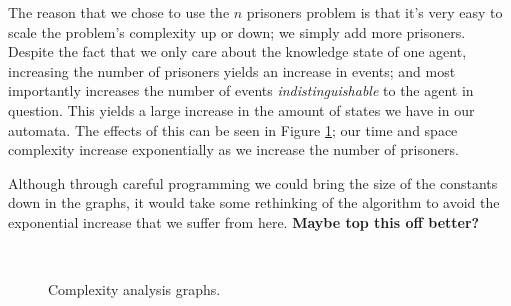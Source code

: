 \documentclass[10pt, a4paper]{report}
\begin{document}
The reason that we chose to use the $n$ prisoners problem is that it's very easy
to scale the problem's complexity up or down; we simply add more prisoners.
Despite the fact that we only care about the knowledge state of one agent,
increasing the number of prisoners yields an increase in events; and most
importantly increases the number of events \emph{indistinguishable} to the agent
in question. This yields a large increase in the amount of states we have in our
automata. The effects of this can be seen in Figure \ref{fig:graphs}; our
time and space complexity increase exponentially as we increase the number of
prisoners. 

Although through careful programming we could bring the size of the constants
down in the graphs, it would take some rethinking of the algorithm to avoid the
exponential increase that we suffer from here. \textbf{Maybe top this off better?}

\begin{figure}[h]
  \centering
  \begin{subfigure}[b]{0.3\textwidth}
  \end{subfigure}%
 ~ 
  \begin{subfigure}[b]{0.3\textwidth}
  \end{subfigure}
  \label{fig:graphs}
  \caption{Complexity analysis graphs.}
\end{figure}
\end{document}
